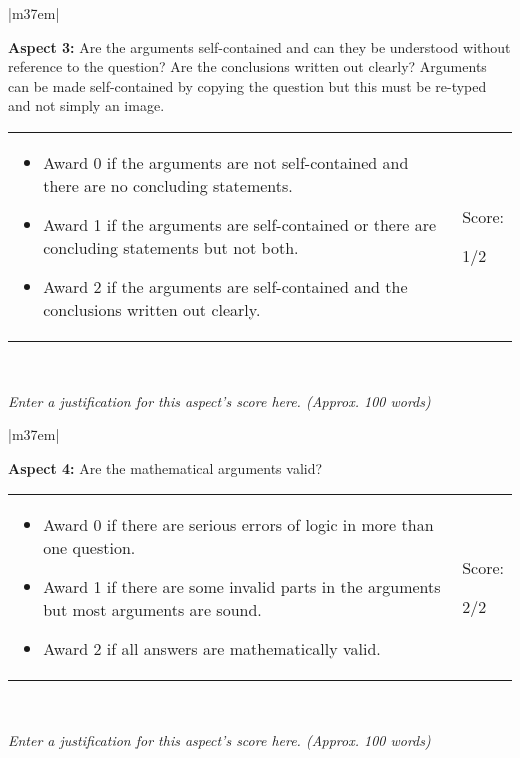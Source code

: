 \documentclass[article,11pt]{book}
\begin{document}
\begin{tabular}{|m{37em}|}
    \hline
    
    \textbf{Aspect 3:} Are the arguments self-contained and can they be understood without reference to the question? Are the conclusions written out clearly? Arguments can be made self-contained by copying the question but this must be re-typed and not simply an image. 
    \\ \hline
    
    \begin{tabular}{m{32em}|m{5em}}
      \begin{itemize}
          \item Award 0 if the arguments are not self-contained and there are no concluding statements.
          \item Award 1 if the arguments are self-contained or there are concluding statements but not both.
          \item Award 2 if the arguments are self-contained and the conclusions written out clearly.
      \end{itemize}  
      &  
      Score: 
      
      \medskip
      {\huge 1/2}
    \end{tabular} 
    \\ \hline
    
    \textit{Enter a justification for this aspect’s score here. (Approx. 100 words)}
    \\ \hline
\end{tabular}

\bigskip


\begin{tabular}{|m{37em}|}
    \hline
    
    \textbf{Aspect 4:} Are the mathematical arguments valid? 
    \\ \hline
    
    \begin{tabular}{m{32em}|m{5em}}
      \begin{itemize}
          \item Award 0 if there are serious errors of logic in more than one question.
          \item Award 1 if there are some invalid parts in the arguments but most arguments are sound.
          \item Award 2 if all answers are mathematically valid.
      \end{itemize}  
      &  
      Score: 
      
      \medskip
      {\huge 2/2}
    \end{tabular} 
    \\ \hline
    
    \textit{Enter a justification for this aspect’s score here. (Approx. 100 words)}
    \\ \hline
\end{tabular}
\end{document}
